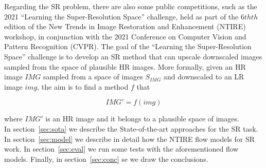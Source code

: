 \documentclass{article}
\begin{document}
Regarding the SR problem, there are also some public competitions, such as the 2021 ``Learning the Super-Resolution Space'' challenge, held as part of the $6th{th}$ edition of the New Trends in Image Restoration and Enhancement (NTIRE) workshop, in conjunction with the 2021 Conference on Computer Vision and Pattern Recognition (CVPR). The goal of the ``Learning the Super-Resolution Space'' challenge is to develop an SR method that can upscale downscaled images sampled from the space of plausible HR images. More formally, given an HR image $IMG$ sampled from a space of images $S_{IMG}$ and downscaled to an LR image $img$, the aim is to find a method $f$ that

\begin{displaymath}
    IMG' = f(img)
\end{displaymath}

\noindent where $IMG'$ is an HR image and it belongs to a plausible space of images. \\

In section~\ref{sec:sota} we describe the State-of-the-art approaches for the SR task. In section~\ref{sec:model} we describe in detail how the NTIRE flow models for SR work. In section~\ref{sec:eval} we run some tests with the aforementioned flow models. Finally, in section~\ref{sec:conc} se we draw the conclusions.
\end{document}

